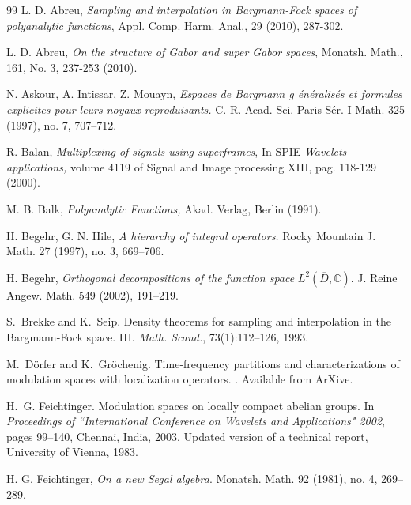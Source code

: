 \documentclass[12pt]{amsart}
\theoremstyle{plain}
\numberwithin{equation}{section}
\begin{document}
\begin{thebibliography}{99}
 L. D. Abreu, \emph{Sampling and interpolation in
Bargmann-Fock spaces of polyanalytic functions}, Appl. Comp. Harm. Anal., 29
(2010), 287-302.

 L. D. Abreu, \emph{On the structure of Gabor and
super Gabor spaces}, Monatsh. Math., 161, No. 3, 237-253 (2010).

 N. Askour, A. Intissar, Z. Mouayn, \emph{Espaces de Bargmann g%
\'{e}n\'{e}ralis\'{e}s et formules explicites pour leurs noyaux
reproduisants.} C. R. Acad. Sci. Paris S\'{e}r. I Math. 325 (1997), no. 7,
707--712. 

 R. Balan, \emph{Multiplexing of signals using superframes},
In SPIE \emph{Wavelets applications, }volume 4119 of Signal and Image
processing XIII, pag. 118-129 (2000).

 M. B. Balk, \emph{Polyanalytic Functions, }Akad. Verlag,
Berlin (1991).

 H. Begehr, G. N. Hile, \emph{A hierarchy of integral
operators.} Rocky Mountain J. Math. 27 (1997), no. 3, 669--706.

 H. Begehr, \emph{Orthogonal decompositions of the function
space} $L^{2}(\overline{D},%
\mathbb{C}
)$. J. Reine Angew. Math. 549 (2002), 191--219.

 S.~Brekke and K.~Seip. \newblock Density theorems for
sampling and interpolation in the {B}argmann-{F}ock space. {III}. \newblock 
\emph{Math. Scand.}, 73(1):112--126, 1993.

 M.~D\"{o}rfer and K.~Gr\"{o}chenig. \newblock Time-frequency
partitions and characterizations of modulation spaces with localization
operators. . Available from ArXive.

 H.~G. Feichtinger. \newblock Modulation spaces on
locally compact abelian groups. \newblock In \emph{Proceedings of
``International Conference on Wavelets and Applications" 2002}, pages
99--140, Chennai, India, 2003. \newblock Updated version of a technical
report, University of Vienna, 1983.

 H. G. Feichtinger, \emph{On a new Segal algebra}. Monatsh.
Math. 92 (1981), no. 4, 269--289. 


\end{thebibliography}
\end{document}
